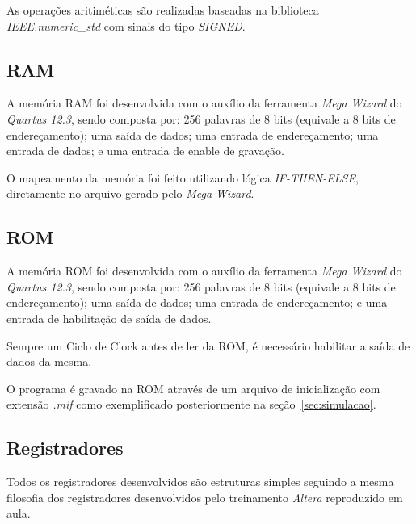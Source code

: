 \documentclass[../main.tex]{subfiles}
\begin{document}
		As operações aritiméticas são realizadas baseadas na biblioteca \textit{IEEE.numeric\_std} com sinais do tipo
		\textit{SIGNED}.
	\subsection{RAM}
		\label{sec:RAM}
		A memória RAM foi desenvolvida com o auxílio da ferramenta \textit{Mega Wizard} do \textit{Quartus 12.3}, sendo composta por: 
		256 palavras de 8 bits (equivale a 8 bits de endereçamento); uma saída de dados; uma entrada de endereçamento; uma entrada de dados; e uma entrada de enable de gravação.
		
		O mapeamento da memória foi feito utilizando lógica \textit{IF-THEN-ELSE}, diretamente no arquivo gerado pelo \textit{Mega Wizard}.
	\subsection{ROM}
		\label{sec:ROM}
		A memória ROM foi desenvolvida com o auxílio da ferramenta \textit{Mega Wizard} do \textit{Quartus 12.3}, sendo composta por:
		256 palavras de 8 bits (equivale a 8 bits de endereçamento); uma saída de dados; uma entrada de endereçamento; e uma entrada de habilitação de saída de dados.
		
		Sempre um Ciclo de Clock antes de \IR{} ler da ROM, é necessário habilitar a saída de dados da mesma.
		
		O programa é gravado na ROM através de um arquivo de inicialização com extensão \textit{.mif} como exemplificado posteriormente na seção~\ref{sec:simulacao}.
		
	\subsection{Registradores}
		\label{sec:registradores}
		
		Todos os registradores desenvolvidos são estruturas simples seguindo a mesma filosofia dos registradores desenvolvidos pelo
		treinamento \textit{Altera} reproduzido em aula.
\end{document}
